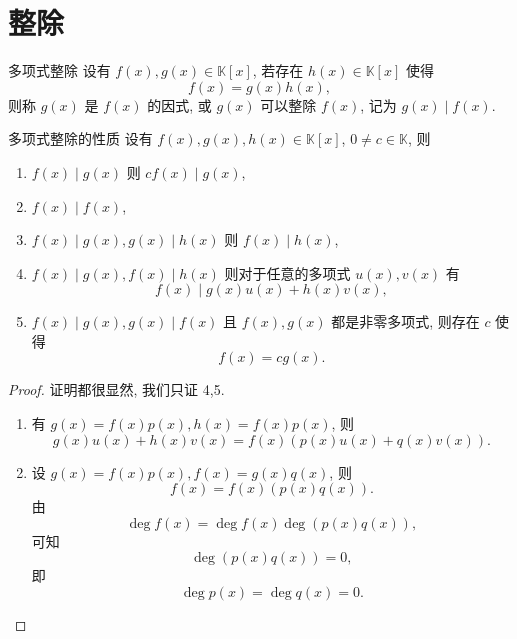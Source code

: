 \documentclass[cn,toc=twocol]{elegantbook}
\newcommand{\ITEMS}{\begin{enumerate}}
\newcommand{\ITEME}{\end{enumerate}}
\newcommand{\K}{\mathbb{K}}
\begin{document}
\section{整除}

\begin{definition}{多项式整除}
设有 $f(x),g(x) \in \K[x]$, 若存在 $h(x) \in \K[x]$ 使得
\[
	f(x) = g(x) h(x),
\]
则称 $g(x)$ 是 $f(x)$ 的因式, 或 $g(x)$ 可以整除 $f(x)$, 记为 $g(x) \mid f(x)$.
	
\end{definition}

\begin{theorem}{多项式整除的性质}
设有 $f(x), g(x), h(x) \in \K[x]$, $0 \neq c \in \K$, 则
\ITEMS
	\item $f(x) \mid g(x)$ 则 $cf(x) \mid g(x)$,
	\item $f(x) \mid f(x)$,
	\item $f(x) \mid g(x), g(x) \mid h(x)$ 则 $f(x) \mid h(x)$,
	\item $f(x) \mid g(x), f(x) \mid h(x)$ 则对于任意的多项式 $u(x),v(x)$ 有
	\[
		f(x) \mid g(x) u(x) + h(x) v(x),
	\]
	\item $f(x) \mid g(x), g(x) \mid f(x)$ 且 $f(x),g(x)$ 都是非零多项式, 则存在 $c$ 使得
	\[
		f(x) = c g(x).
	\]
\ITEME	
\end{theorem}

\begin{proof}
	证明都很显然, 我们只证 4,5.
	\ITEMS
		\item[4] 有 $g(x) = f(x) p(x), h(x) = f(x) p(x)$, 则
		\[
			g(x) u(x) + h(x) v(x) = f(x) (p(x) u(x) + q(x) v(x)).
		\] 
		\item[5] 设 $g(x) = f(x) p(x), f(x) = g(x) q(x)$, 则
		\[
			f(x) = f(x) (p(x) q(x)).
		\]
		由
		\[
			\deg f(x) = \deg f(x) \deg (p(x) q(x)),
		\]
		可知
		\[
			\deg (p(x) q(x)) = 0,
		\]
		即
		\[
			\deg p(x) = \deg q(x) = 0.
		\]
	\ITEME
\end{proof}
\end{document}
